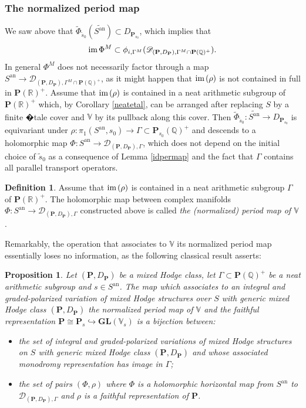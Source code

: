 \documentclass[10pt]{article}
\numberwithin{equation}{subsection}
\theoremstyle{plain}
\newtheorem{proposition}[theorem]{Proposition}
\theoremstyle{definition}
\newtheorem{definition}[theorem]{Definition}
\theoremstyle{remark}
\newcommand{\Q}{\mathbb Q}
\newcommand{\R}{\mathbb R}
\newcommand{\V}{\mathbb V}
\newcommand{\pp}{\mathbf P}
\newcommand{\im}{\mathrm{im} \hspace{0.05cm}}
\newcommand{\an}{\mathrm{an}}
\newcommand{\gl}{\mathbf{GL}}
\newcommand{\period}{\mathscr{D}}
\begin{document}
\subsubsection*{The normalized period map}
We saw above that $\tilde{\Phi}_{\tilde{s}_0}(\widetilde{S^\an}) \subset D_{\pp_{s_0}}$, which implies that
\[
\im \Phi^M \subset \phi_{i, \Gamma^M}(\period_{(\pp, D_\pp), \Gamma^M \cap \pp(\Q)^+}).
\]
In general $\Phi^M$ does not necessarily factor through a map $S^\an \rightarrow \period_{(\pp, D_\pp), \Gamma^M \cap \pp(\Q)^+}$, as it might happen that $\im(\rho)$ is not contained in full in $\pp(\R)^+$.  Assume that $\im(\rho)$ is contained in a neat arithmetic subgroup of $\pp(\R)^+$ which, by Corollary \ref{neatetal}, can be arranged after replacing $S$ by a finite �tale cover and $\V$ by its pullback along this cover. Then $\tilde{\Phi}_{\tilde{s}_0} : \widetilde{S^\an} \rightarrow D_{\pp_{s_0}}$ is equivariant under $\rho : \pi_1(S^\an, s_0) \rightarrow \Gamma \subset \pp_{s_0}(\Q)^+$ and descends to a holomorphic map $\Phi : S^\an \rightarrow \period_{(\pp, D_\pp), \Gamma}$, which does not depend on the initial choice of $\tilde{s}_0$ as a consequence of Lemma \ref{idpermap} and the fact that $\Gamma$ contains all parallel transport operators.
\begin{definition}
Assume that $\im(\rho)$ is contained in a neat arithmetic subgroup $\Gamma$ of $\pp(\R)^+$. The holomorphic map between complex manifolds $\Phi : S^\an \rightarrow \period_{(\pp, D_\pp), \Gamma}$ constructed above is called \textit{the (normalized) period map of $\V$}.
\end{definition}
Remarkably, the operation that associates to $\V$ its normalized period map essentially loses no information, as the following classical result asserts: 
\begin{proposition}\label{pervarequiv}
Let $(\pp, D_\pp)$ be a mixed Hodge class, let $\Gamma \subset \pp(\Q)^+$ be a neat arithmetic subgroup and $s \in S^\an$. The map which associates to an integral and graded-polarized variation of mixed Hodge structures over $S$ with generic mixed Hodge class $(\pp, D_\pp)$ the normalized period map of $\V$ and the faithful representation $\pp \cong \pp_s \hookrightarrow \gl(\V_s)$ is a bijection between:
\begin{itemize}
\item the set of integral and graded-polarized variations of mixed Hodge structures on $S$ with generic mixed Hodge class $(\pp, D_\pp)$ and whose associated monodromy representation has image in $\Gamma$;
\item the set of pairs $(\Phi, \rho)$ where $\Phi$ is a holomorphic horizontal map from $S^\an$ to $\period_{(\pp, D_\pp), \Gamma}$ and $\rho$ is a faithful representation of $\pp$.
\end{itemize}
\end{proposition}
\end{document}
